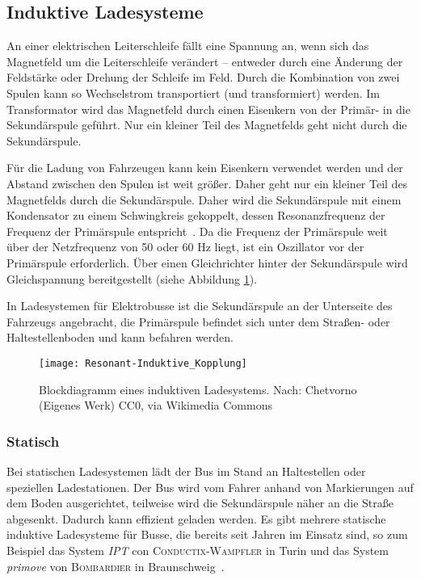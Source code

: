 \subsection{Induktive Ladesysteme}
An einer elektrischen Leiterschleife fällt eine Spannung an, wenn sich das Magnetfeld um die Leiterschleife verändert – entweder durch eine Änderung der Feldstärke oder Drehung der Schleife im Feld. Durch die Kombination von zwei Spulen kann so Wechselstrom transportiert (und transformiert) werden. Im Transformator wird das Magnetfeld durch einen Eisenkern von der Primär- in die Sekundärspule geführt. Nur ein kleiner Teil des Magnetfelds geht nicht durch die Sekundärspule.

Für die Ladung von Fahrzeugen kann kein Eisenkern verwendet werden und der Abstand zwischen den Spulen ist weit größer. Daher geht nur ein kleiner Teil des Magnetfelds durch die Sekundärspule. Daher wird die Sekundärspule mit einem Kondensator zu einem Schwingkreis gekoppelt, dessen Resonanzfrequenz der Frequenz der Primärspule entspricht~\cite{Kurs06072007}. Da die Frequenz der Primärspule weit über der Netzfrequenz von 50 oder 60 Hz liegt, ist ein Oszillator vor der Primärspule erforderlich. Über einen Gleichrichter hinter der Sekundärspule wird Gleichspannung bereitgestellt (siehe Abbildung \ref{abb_ResIndKopplung}).

In Ladesystemen für Elektrobusse ist die Sekundärspule an der Unterseite des Fahrzeugs angebracht, die Primärspule befindet sich unter dem Straßen- oder Haltestellenboden und kann befahren werden.


\begin{figure}\centering
	\texttt{[image: Resonant-Induktive\_Kopplung]}
	\caption[Blockdiagramm eines induktiven Ladesystems]{Blockdiagramm eines induktiven Ladesystems. Nach: Chetvorno (Eigenes Werk) CC0, via Wikimedia Commons}
	\label{abb_ResIndKopplung}
\end{figure}

\subsubsection{Statisch}
Bei statischen Ladesystemen lädt der Bus im Stand an Haltestellen oder speziellen Ladestationen. Der Bus wird vom Fahrer anhand von Markierungen auf dem Boden ausgerichtet, teilweise wird die Sekundärspule näher an die Straße abgesenkt. Dadurch kann effizient geladen werden. Es gibt mehrere statische induktive Ladesysteme für Busse, die bereits seit Jahren im Einsatz sind, so zum Beispiel das System \emph{IPT} con \textsc{Conductix-Wampfler} in Turin und das System \emph{primove} von \textsc{Bombardier} in Braunschweig~\cite{WeIPT}.

